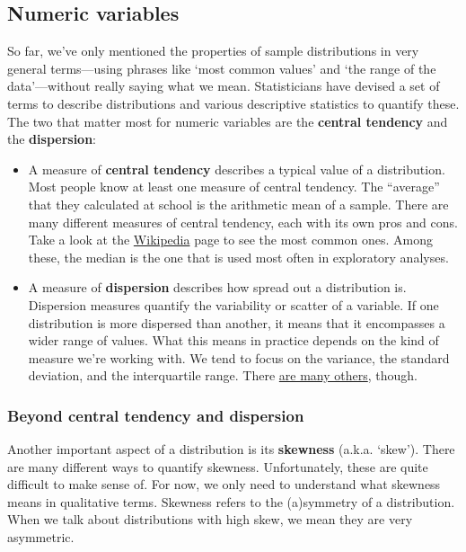 \documentclass[
]{book}
\newenvironment{greybox}{
  \definecolor{shadecolor}{rgb}{0.95,0.95,0.95}  %
  \color{black}
  \begin{shaded}}
 {\end{shaded}}
\newenvironment{infobox}[1]
  {
  \begin{itemize}
  \renewcommand{\labelitemi}{
    \raisebox{-.7\height}[0pt][0pt]{
      {\setkeys{Gin}{width=3em,keepaspectratio}
        \texttt{[image: images/\#1]}}
    }
  }
  \setlength{\fboxsep}{1em}
  \begin{greybox}
  \item
  }
  {
  \end{greybox}
  \end{itemize}
  }
\begin{document}
\hypertarget{numeric-variables}{%
\subsection{Numeric variables}\label{numeric-variables}}

So far, we've only mentioned the properties of sample distributions in very general terms---using phrases like `most common values' and `the range of the data'---without really saying what we mean. Statisticians have devised a set of terms to describe distributions and various descriptive statistics to quantify these. The two that matter most for numeric variables are the \textbf{central tendency} and the \textbf{dispersion}:

\begin{itemize}
\item
  A measure of \textbf{central tendency} describes a typical value of a distribution. Most people know at least one measure of central tendency. The ``average'' that they calculated at school is the arithmetic mean of a sample. There are many different measures of central tendency, each with its own pros and cons. Take a look at the \href{http://en.wikipedia.org/wiki/Central_tendency}{Wikipedia} page to see the most common ones. Among these, the median is the one that is used most often in exploratory analyses.
\item
  A measure of \textbf{dispersion} describes how spread out a distribution is. Dispersion measures quantify the variability or scatter of a variable. If one distribution is more dispersed than another, it means that it encompasses a wider range of values. What this means in practice depends on the kind of measure we're working with. We tend to focus on the variance, the standard deviation, and the interquartile range. There \href{http://en.wikipedia.org/wiki/Statistical_dispersion}{are many others}, though.
\end{itemize}

\begin{infobox}{information}

\hypertarget{beyond-central-tendency-and-dispersion}{%
\subsubsection*{Beyond central tendency and dispersion}\label{beyond-central-tendency-and-dispersion}}

Another important aspect of a distribution is its \textbf{skewness} (a.k.a. `skew'). There are many different ways to quantify skewness. Unfortunately, these are quite difficult to make sense of. For now, we only need to understand what skewness means in qualitative terms. Skewness refers to the (a)symmetry of a distribution. When we talk about distributions with high skew, we mean they are very asymmetric.

\end{infobox}
\end{document}
